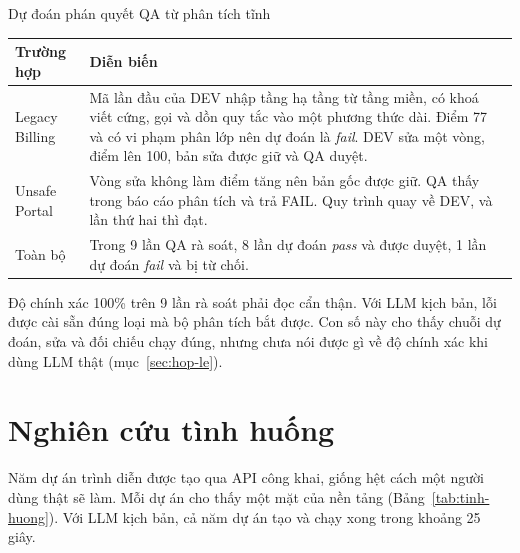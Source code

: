 \begin{table}{Dự đoán phán quyết QA từ phân tích tĩnh}
\label{tab:chat-luong-ma}
\small
\begin{tabularx}{\textwidth}{|P{2.6cm}|L|}
\hline
\textbf{Trường hợp} & \textbf{Diễn biến} \\ \hline
Legacy Billing & Mã lần đầu của DEV nhập tầng hạ tầng từ tầng miền, có khoá viết cứng, gọi  và dồn quy tắc vào một phương thức dài. Điểm 77 và có vi phạm phân lớp nên dự đoán là \textit{fail}. DEV sửa một vòng, điểm lên 100, bản sửa được giữ và QA duyệt. \\ \hline
Unsafe Portal & Vòng sửa không làm điểm tăng nên bản gốc được giữ. QA thấy  trong báo cáo phân tích và trả FAIL. Quy trình quay về DEV, và lần thứ hai thì đạt. \\ \hline
Toàn bộ & Trong 9 lần QA rà soát, 8 lần dự đoán \textit{pass} và được duyệt, 1 lần dự đoán \textit{fail} và bị từ chối. \\ \hline
\end{tabularx}
\end{table}

Độ chính xác 100\% trên 9 lần rà soát phải đọc cẩn thận. Với LLM kịch bản, lỗi được cài sẵn đúng loại mà bộ phân tích bắt được. Con số này cho thấy chuỗi dự đoán, sửa và đối chiếu chạy đúng, nhưng chưa nói được gì về độ chính xác khi dùng LLM thật (mục~\ref{sec:hop-le}).

\section{Nghiên cứu tình huống}

Năm dự án trình diễn được tạo qua API công khai, giống hệt cách một người dùng thật sẽ làm. Mỗi dự án cho thấy một mặt của nền tảng (Bảng~\ref{tab:tinh-huong}). Với LLM kịch bản, cả năm dự án tạo và chạy xong trong khoảng 25 giây.

